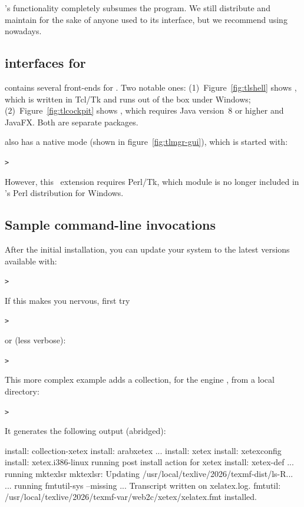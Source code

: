 \documentclass[12pt]{article}
\begin{document}
's functionality completely subsumes the 
program.  We still distribute and maintain  for the sake
of anyone used to its interface, but we recommend using 
nowadays.

\subsection{\GUI{} interfaces for }

\TL{} contains several \GUI{} front-ends for . Two notable
ones: (1)~Figure~\ref{fig:tlshell} shows , which is
written in Tcl/Tk and runs out of the box under Windows;
(2)~Figure~\ref{fig:tlcockpit} shows , which requires
Java version~8 or higher and JavaFX. Both are separate packages.

 also has a native \GUI{} mode (shown in
figure~\ref{fig:tlmgr-gui}), which is started with:
\begin{alltt}
> 
\end{alltt}
However, this \GUI\ extension requires Perl/Tk, which module is no
longer included in \TL's Perl distribution for Windows.

\subsection{Sample  command-line invocations}

After the initial installation, you can update your system to the latest
versions available with:
\begin{alltt}
> 
\end{alltt}
If this makes you nervous, first try
\begin{alltt}
> 
\end{alltt}
or (less verbose):
\begin{alltt}
> 
\end{alltt}

This more complex example adds a collection, for the engine \XeTeX, from
a local directory:

\begin{alltt}
> 
\end{alltt}
It generates the following output (abridged):
\begin{fverbatim}
install: collection-xetex
install: arabxetex
...
install: xetex
install: xetexconfig
install: xetex.i386-linux
running post install action for xetex
install: xetex-def
...
running mktexlsr
mktexlsr: Updating /usr/local/texlive/2026/texmf-dist/ls-R...
...
running fmtutil-sys --missing
...
Transcript written on xelatex.log.
fmtutil: /usr/local/texlive/2026/texmf-var/web2c/xetex/xelatex.fmt installed.
\end{fverbatim}
\end{document}
